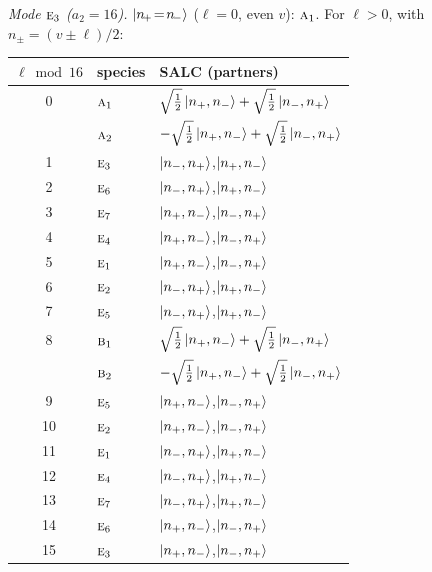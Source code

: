 \documentclass[11pt]{article}
\newcommand{\irr}[1]{\text{\normalfont\scshape #1}}
\begin{document}
\emph{Mode $\irr{e}_{3}$ ($a_2=16$).} $\ket{n_{\!+}\!=\!n_{\!-}}$ ($\ell=0$, even $v$): $\irr{a}_{1}$. For $\ell>0$, with $n_\pm=(v\pm\ell)/2$:
\begin{longtable}{c l l}\hline $\ell\bmod 16$ & species & SALC (partners)\\ \hline\endhead
0 & $\irr{a}_{1}$ & $\sqrt{\tfrac{1}{2}}\ket{n_+,n_-}+\sqrt{\tfrac{1}{2}}\ket{n_-,n_+}$\\
 & $\irr{a}_{2}$ & $-\sqrt{\tfrac{1}{2}}\ket{n_+,n_-}+\sqrt{\tfrac{1}{2}}\ket{n_-,n_+}$\\
1 & $\irr{e}_{3}$ & $\ket{n_-,n_+}$,\quad $\ket{n_+,n_-}$\\
2 & $\irr{e}_{6}$ & $\ket{n_-,n_+}$,\quad $\ket{n_+,n_-}$\\
3 & $\irr{e}_{7}$ & $\ket{n_+,n_-}$,\quad $\ket{n_-,n_+}$\\
4 & $\irr{e}_{4}$ & $\ket{n_+,n_-}$,\quad $\ket{n_-,n_+}$\\
5 & $\irr{e}_{1}$ & $\ket{n_+,n_-}$,\quad $\ket{n_-,n_+}$\\
6 & $\irr{e}_{2}$ & $\ket{n_-,n_+}$,\quad $\ket{n_+,n_-}$\\
7 & $\irr{e}_{5}$ & $\ket{n_-,n_+}$,\quad $\ket{n_+,n_-}$\\
8 & $\irr{b}_{1}$ & $\sqrt{\tfrac{1}{2}}\ket{n_+,n_-}+\sqrt{\tfrac{1}{2}}\ket{n_-,n_+}$\\
 & $\irr{b}_{2}$ & $-\sqrt{\tfrac{1}{2}}\ket{n_+,n_-}+\sqrt{\tfrac{1}{2}}\ket{n_-,n_+}$\\
9 & $\irr{e}_{5}$ & $\ket{n_+,n_-}$,\quad $\ket{n_-,n_+}$\\
10 & $\irr{e}_{2}$ & $\ket{n_+,n_-}$,\quad $\ket{n_-,n_+}$\\
11 & $\irr{e}_{1}$ & $\ket{n_-,n_+}$,\quad $\ket{n_+,n_-}$\\
12 & $\irr{e}_{4}$ & $\ket{n_-,n_+}$,\quad $\ket{n_+,n_-}$\\
13 & $\irr{e}_{7}$ & $\ket{n_-,n_+}$,\quad $\ket{n_+,n_-}$\\
14 & $\irr{e}_{6}$ & $\ket{n_+,n_-}$,\quad $\ket{n_-,n_+}$\\
15 & $\irr{e}_{3}$ & $\ket{n_+,n_-}$,\quad $\ket{n_-,n_+}$\\
\hline\end{longtable}
\end{document}
